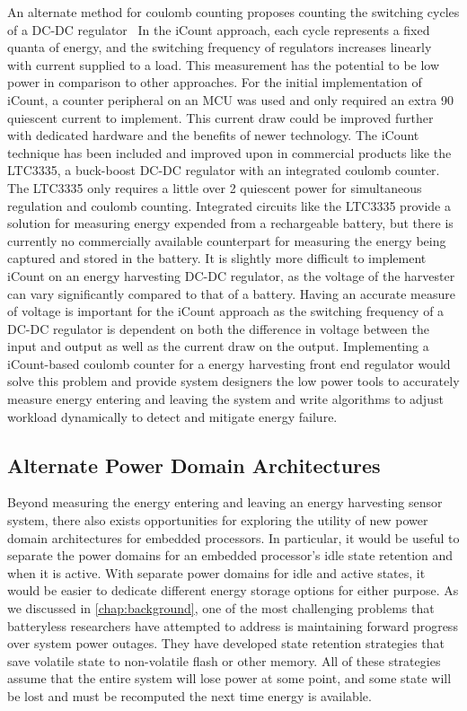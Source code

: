 An alternate method for coulomb counting proposes counting the switching cycles of a DC-DC regulator~\cite{duttaEnergy08} In the iCount approach, each cycle represents a fixed quanta of energy, and the switching frequency of regulators increases linearly with current supplied to a load.
This measurement has the potential to be low power in comparison to other approaches.
For the initial implementation of iCount, a counter peripheral on an MCU was used and only required an extra 90\ssi{\nano\ampere} quiescent current to implement. This current draw could be improved further with dedicated hardware and the benefits of newer technology.
The iCount technique has been included and improved upon in commercial products like the LTC3335, a buck-boost DC-DC regulator with an integrated coulomb counter. 
The LTC3335 only requires a little over 2\ssi{\micro\watt} quiescent power for simultaneous regulation and coulomb counting.
Integrated circuits like the LTC3335 provide a solution for measuring energy expended from a rechargeable battery, but there is currently no commercially available counterpart for measuring the energy being captured and stored in the battery.
It is slightly more difficult to implement iCount on an energy harvesting DC-DC regulator, as the voltage of the harvester can vary significantly compared to that of a battery.
Having an accurate measure of voltage is important for the iCount approach as the switching frequency of a DC-DC regulator is dependent on both the difference in voltage between the input and output as well as the current draw on the output.
Implementing a iCount-based coulomb counter for a 
energy harvesting front end regulator would solve this problem and provide system designers the low power tools to accurately measure energy entering and leaving the system and write algorithms to adjust workload dynamically to detect and mitigate energy failure. 

\subsection{Alternate Power Domain Architectures}
Beyond measuring the energy entering and leaving an energy harvesting sensor system, there also exists opportunities for exploring the utility of new power domain architectures for embedded processors.
In particular, it would be useful to separate the power domains for an embedded processor's idle state retention and when it is active.
With separate power domains for idle and active states, it would be easier to dedicate different energy storage options for either purpose.
As we discussed in \cref{chap:background}, one of the most challenging problems that batteryless researchers have attempted to address is maintaining forward progress over system power outages.
They have developed state retention strategies that save volatile state to non-volatile flash or other memory.
All of these strategies assume that the entire system will lose power at some point, and some state will be lost and must be recomputed the next time energy is available.

